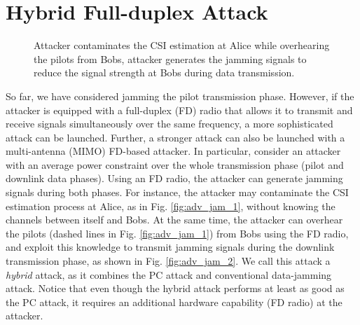 \documentclass[draftclsnofoot, 12pt, onecolumn, journal]{IEEEtran}
\begin{document}
\section{Hybrid Full-duplex Attack}
\label{sec:advjam}
%
\begin{figure}[!t]
\centering
{}
\hfil
{}
\caption{ Attacker contaminates the CSI estimation at Alice while overhearing the pilots from Bobs,  attacker generates the jamming signals to reduce the signal strength at Bobs during data transmission.}
\label{fig:adv_jam_scenario}
\end{figure}
%
So far, we have considered jamming the pilot transmission phase.
However, if the attacker is equipped with a full-duplex (FD) radio that allows it to transmit and receive signals simultaneously over the same frequency, a more sophisticated attack can be launched.
Further, a stronger attack can also be launched with a multi-antenna (MIMO) FD-based attacker.
In particular, consider an attacker with an average power constraint over the whole transmission phase (pilot and downlink data phases).
Using an FD radio, the attacker can generate jamming signals during both phases.
For instance, the attacker may contaminate the CSI estimation process at Alice, as in Fig. \ref{fig:adv_jam_1}, without knowing the channels between itself and Bobs.
At the same time, the attacker can overhear the pilots (dashed lines in Fig. \ref{fig:adv_jam_1}) from Bobs using the FD radio, and exploit this knowledge to transmit jamming signals during the downlink transmission phase, as shown in Fig. \ref{fig:adv_jam_2}.
We call this attack a \textit{hybrid} attack, as it combines the PC attack and conventional data-jamming attack. 
Notice that even though the hybrid attack performs at least as good as the PC attack, it requires an additional hardware capability (FD radio) at the attacker.
\end{document}
